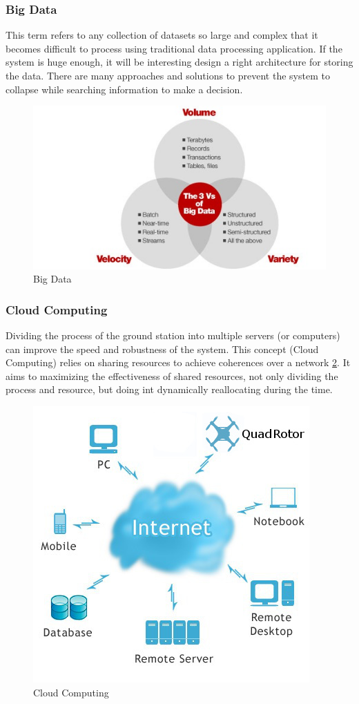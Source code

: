 	\subsubsection{Big Data}
	This term refers to any collection of datasets so large and complex that it becomes difficult to process using traditional data processing application. If the system is huge enough, it will be interesting design a right architecture for storing the data. There are many approaches\cite{Big_data_Ecosystem} \cite{Big_data_mapReduce} and solutions to prevent the system to collapse while searching information to make a decision.
	
	\begin{figure}[th]
		\centering
		\includegraphics[width=0.7\linewidth]{../Images/c6/big_data}
		\caption{Big Data}
		\label{fig:big_data}
	\end{figure}
		
	\subsubsection{Cloud Computing}

	Dividing the process of the ground station into multiple servers (or computers) can improve the speed and robustness of the system. This concept (Cloud Computing) relies on sharing resources to achieve coherences over a network \ref{fig:cloud_computing}. It aims to maximizing the effectiveness of shared resources, not only dividing the process and resource, but doing int dynamically reallocating during the time. \cite{Cloud_computing}
	
	\begin{figure}[th]
		\centering
		\includegraphics[width=0.7\linewidth]{../Images/c6/cloudcomputing}
		\caption{Cloud Computing}
		\label{fig:cloud_computing}
	\end{figure}
	
	
	
